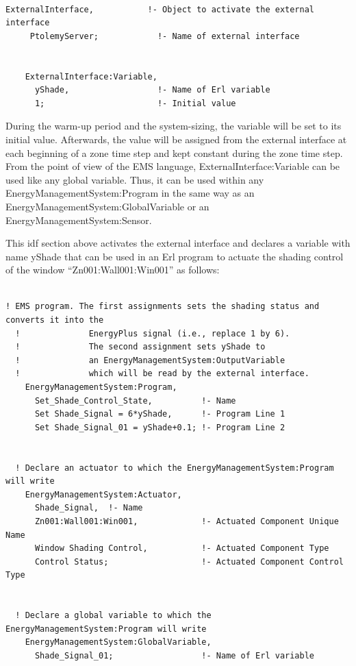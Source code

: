 \begin{lstlisting}

ExternalInterface,           !- Object to activate the external interface
     PtolemyServer;            !- Name of external interface


    ExternalInterface:Variable,
      yShade,                  !- Name of Erl variable
      1;                       !- Initial value
\end{lstlisting}

During the warm-up period and the system-sizing, the variable will be set to its initial value. Afterwards, the value will be assigned from the external interface at each beginning of a zone time step and kept constant during the zone time step. From the point of view of the EMS language, ExternalInterface:Variable can be used like any global variable. Thus, it can be used within any EnergyManagementSystem:Program in the same way as an EnergyManagementSystem:GlobalVariable or an EnergyManagementSystem:Sensor.

This idf section above activates the external interface and declares a variable with name yShade that can be used in an Erl program to actuate the shading control of the window ``Zn001:Wall001:Win001'' as follows:

\begin{lstlisting}

! EMS program. The first assignments sets the shading status and converts it into the
  !              EnergyPlus signal (i.e., replace 1 by 6).
  !              The second assignment sets yShade to
  !              an EnergyManagementSystem:OutputVariable
  !              which will be read by the external interface.
    EnergyManagementSystem:Program,
      Set_Shade_Control_State,          !- Name
      Set Shade_Signal = 6*yShade,      !- Program Line 1
      Set Shade_Signal_01 = yShade+0.1; !- Program Line 2


  ! Declare an actuator to which the EnergyManagementSystem:Program will write
    EnergyManagementSystem:Actuator,
      Shade_Signal,  !- Name
      Zn001:Wall001:Win001,             !- Actuated Component Unique Name
      Window Shading Control,           !- Actuated Component Type
      Control Status;                   !- Actuated Component Control Type


  ! Declare a global variable to which the EnergyManagementSystem:Program will write
    EnergyManagementSystem:GlobalVariable,
      Shade_Signal_01;                  !- Name of Erl variable
\end{lstlisting}

